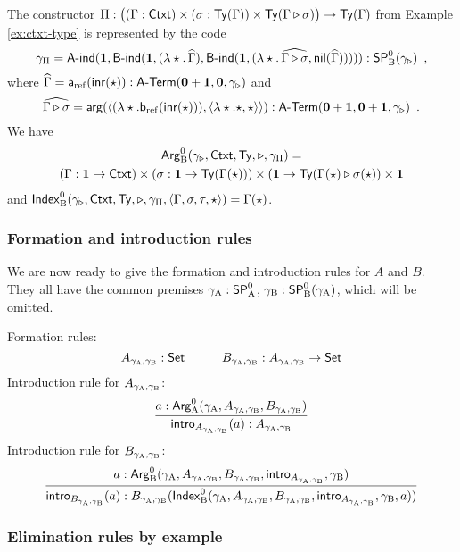 \documentclass{schwicht}
\begin{document}
\begin{example} 
  The constructor $\Pi : \big((\Gamma : \mathsf{Ctxt}) \times (\sigma : \mathsf{Ty}(\Gamma))
  \times \mathsf{Ty}(\Gamma \triangleright \sigma)\big) \to \mathsf{Ty}(\Gamma)$ from Example
\ref{ex:ctxt-type} is represented by the code
%
\[
\gamma_{\Pi} = \mathsf{A}\text{-}\mathsf{ind}(\mathbf{1}, \mathsf{B}\text{-}\mathsf{ind}(\mathbf{1}, (\lambda \star.\,\widehat{\Gamma}),\mathsf{B}\text{-}\mathsf{ind}(\mathbf{1},
(\lambda \star.\,\widehat{\Gamma \triangleright \sigma}, \mathsf{nil}(\widehat{\Gamma}))))) : \mathsf{SP}^{0}_{\mathrm{B}}(\gamma_{\triangleright}) \enspace ,
\]
  where $\widehat{\Gamma} = \mathsf{a}_{\mathrm{ref}}(\mathsf{inr}(\star)) : \mathsf{A}\text{-}\mathsf{Term}(\mathbf{0} +
  \mathbf{1}, \mathbf{0}, \gamma_{\triangleright})$ and
  \[
  \widehat{\Gamma \triangleright \sigma} = \mathsf{arg}(\langle (\lambda
  \star.\mathsf{b}_{\mathrm{ref}}(\mathsf{inr}(\star))), \langle \lambda \star.\star,
  \star\rangle\rangle) : \mathsf{A}\text{-}\mathsf{Term}(\mathbf{0} + \mathbf{1}, \mathbf{0} + \mathbf{1},
  \gamma_{\triangleright}) \enspace .
  \]
%
We have 
\begin{multline*}
  \mathsf{Arg}^{0}_{\mathrm{B}}(\gamma_{\triangleright}, \mathsf{Ctxt}, \mathsf{Ty}, \triangleright,
  \gamma_{\Pi}) = \\
 (\Gamma : \mathbf{1} \to \mathsf{Ctxt}) \times (\sigma : \mathbf{1} \to
  \mathsf{Ty}(\Gamma(\star))) \times (\mathbf{1} \to
  \mathsf{Ty}(\Gamma(\star) \triangleright \sigma(\star)) \times \mathbf{1}
\end{multline*}
and $\mathsf{Index}^{0}_{\mathrm{B}}(\gamma_{\triangleright}, \mathsf{Ctxt}, \mathsf{Ty}, \triangleright,
\gamma_{\Pi}, \langle \Gamma, \sigma, \tau, \star\rangle) =
\Gamma(\star)$.
\blackqed
\end{example}

\subsubsection{Formation and introduction rules}
\label{sec:intro}

We are now ready to give the formation and introduction rules for $A$
and $B$. They all have the common premises $\gamma_{\mathrm{A}} : \mathsf{SP}^{0}_{\mathrm{A}}$, $\gamma_{\mathrm{B}}
: \mathsf{SP}^{0}_{\mathrm{B}}(\gamma_{\mathrm{A}})$, which will be omitted.

Formation rules:
%
\[
A_{\gamma_{\mathrm{A}}, \gamma_{\mathrm{B}}} : \mathsf{Set} \qquad\quad
B_{\gamma_{\mathrm{A}}, \gamma_{\mathrm{B}}} : A_{\gamma_{\mathrm{A}}, \gamma_{\mathrm{B}}} \to \mathsf{Set}
\]
%
Introduction rule for $A_{\gamma_{\mathrm{A}}, \gamma_{\mathrm{B}}}$:
%
\[ 
\infer{\intro{A_{\gammaAB}}(a) : A_{\gammaAB}}{a : \ArgAp(\gammaA, A_{\gammaAB}, B_{\gammaAB})}
\]
%
Introduction rule for $B_{\gamma_{\mathrm{A}}, \gamma_{\mathrm{B}}}$:
%
\[
\infer{\intro{B_{\gammaAB}}(a) : B_{\gammaAB}(\IndexBp(\gammaA, A_{\gammaAB}, B_{\gammaAB}, \intro{A_{\gammaAB}}, \gammaB, a))}{a : \ArgBp(\gammaA, A_{\gammaAB}, B_{\gammaAB}, \intro{A_{\gammaAB}}, \gammaB)}
\]
%

\subsubsection{Elimination rules by example}
\label{sec:elim}
\end{document}
